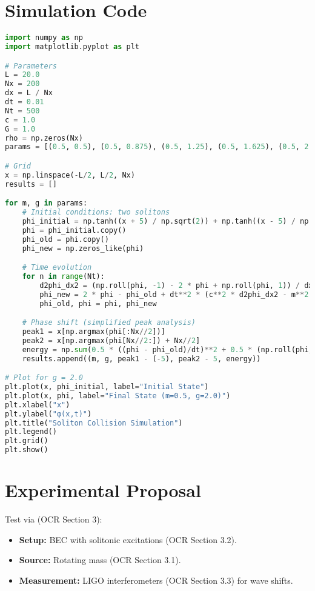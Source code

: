 \documentclass{article}
\begin{document}
\section{Simulation Code}
\begin{lstlisting}[language=Python, caption=Soliton Scaling Simulation, label=lst:soliton]
import numpy as np
import matplotlib.pyplot as plt

# Parameters
L = 20.0
Nx = 200
dx = L / Nx
dt = 0.01
Nt = 500
c = 1.0
G = 1.0
rho = np.zeros(Nx)
params = [(0.5, 0.5), (0.5, 0.875), (0.5, 1.25), (0.5, 1.625), (0.5, 2.0)]

# Grid
x = np.linspace(-L/2, L/2, Nx)
results = []

for m, g in params:
    # Initial conditions: two solitons
    phi_initial = np.tanh((x + 5) / np.sqrt(2)) + np.tanh((x - 5) / np.sqrt(2))
    phi = phi_initial.copy()
    phi_old = phi.copy()
    phi_new = np.zeros_like(phi)

    # Time evolution
    for n in range(Nt):
        d2phi_dx2 = (np.roll(phi, -1) - 2 * phi + np.roll(phi, 1)) / dx**2  # Periodic boundaries
        phi_new = 2 * phi - phi_old + dt**2 * (c**2 * d2phi_dx2 - m**2 * phi - g * phi**3 + 8 * np.pi * G * rho)
        phi_old, phi = phi, phi_new

    # Phase shift (simplified peak analysis)
    peak1 = x[np.argmax(phi[:Nx//2])]
    peak2 = x[np.argmax(phi[Nx//2:]) + Nx//2]
    energy = np.sum(0.5 * ((phi - phi_old)/dt)**2 + 0.5 * (np.roll(phi, -1) - phi)/dx**2 + 0.5 * m**2 * phi**2 + 0.25 * g * phi**4)
    results.append((m, g, peak1 - (-5), peak2 - 5, energy))

# Plot for g = 2.0
plt.plot(x, phi_initial, label="Initial State")
plt.plot(x, phi, label="Final State (m=0.5, g=2.0)")
plt.xlabel("x")
plt.ylabel("φ(x,t)")
plt.title("Soliton Collision Simulation")
plt.legend()
plt.grid()
plt.show()
\end{lstlisting}

\section{Experimental Proposal}
Test via (OCR Section 3):
\begin{itemize}
    \item \textbf{Setup:} BEC with solitonic excitations (OCR Section 3.2).
    \item \textbf{Source:} Rotating mass (OCR Section 3.1).
    \item \textbf{Measurement:} LIGO interferometers (OCR Section 3.3) for wave shifts.
\end{itemize}
\end{document}
